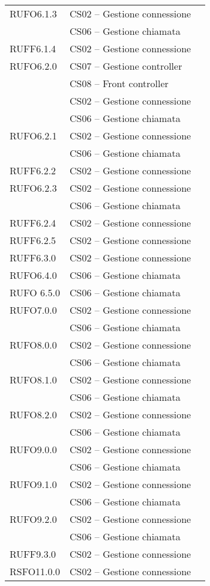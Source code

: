 \begin{center}
\begin{longtable}{lp{}l}
RUFO6.1.3 & CS02 -- Gestione connessione \\
  & CS06 -- Gestione chiamata \\
RUFF6.1.4 & CS02 -- Gestione connessione \\
RUFO6.2.0 & CS07 -- Gestione controller \\
 & CS08 -- Front controller \\
 & CS02 -- Gestione connessione \\
   & CS06 -- Gestione chiamata \\
RUFO6.2.1 & CS02 -- Gestione connessione \\
  & CS06 -- Gestione chiamata \\
RUFF6.2.2 & CS02 -- Gestione connessione \\
RUFO6.2.3 & CS02 -- Gestione connessione \\
  & CS06 -- Gestione chiamata \\
RUFF6.2.4 & CS02 -- Gestione connessione \\
RUFF6.2.5 & CS02 -- Gestione connessione \\
RUFF6.3.0 & CS02 -- Gestione connessione \\
RUFO6.4.0   & CS06 -- Gestione chiamata \\
RUFO 6.5.0  & CS06 -- Gestione chiamata \\
RUFO7.0.0 & CS02 -- Gestione connessione \\
  & CS06 -- Gestione chiamata \\
RUFO8.0.0 & CS02 -- Gestione connessione \\
  & CS06 -- Gestione chiamata \\
RUFO8.1.0 & CS02 -- Gestione connessione \\
  & CS06 -- Gestione chiamata \\
RUFO8.2.0 & CS02 -- Gestione connessione \\
  & CS06 -- Gestione chiamata \\
RUFO9.0.0 & CS02 -- Gestione connessione \\
  & CS06 -- Gestione chiamata \\
RUFO9.1.0 & CS02 -- Gestione connessione \\
  & CS06 -- Gestione chiamata \\
RUFO9.2.0 & CS02 -- Gestione connessione \\
  & CS06 -- Gestione chiamata \\
RUFF9.3.0 & CS02 -- Gestione connessione \\
RSFO11.0.0 & CS02 -- Gestione connessione \\

\end{longtable}
\end{center}
